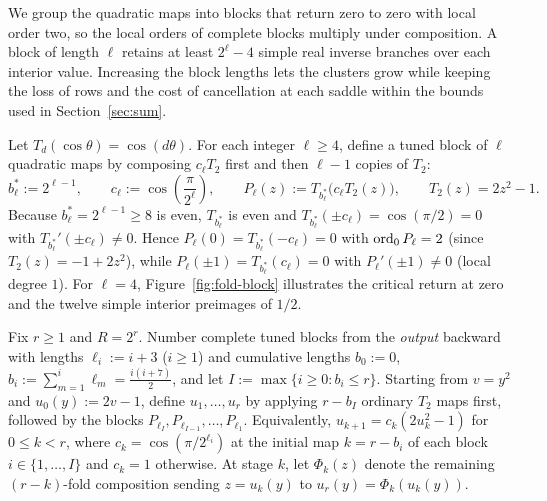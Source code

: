 We group the quadratic maps into blocks that return zero to zero with local order two, so the local orders of complete blocks multiply under composition. A block of length \(\ell\) retains at least \(2^\ell-4\) simple real inverse branches over each interior value. Increasing the block lengths lets the clusters grow while keeping the loss of rows and the cost of cancellation at each saddle within the bounds used in Section~\ref{sec:sum}.

Let $T_d(\cos\theta)=\cos(d\theta)$. For each integer $\ell\ge 4$, define a tuned block of $\ell$ quadratic maps by composing $c_\ell T_2$ first and then $\ell-1$ copies of $T_2$:
\begin{equation}\label{eq:Pl-block}
  b_\ell^* := 2^{\ell-1}, \qquad c_\ell := \cos\left(\frac{\pi}{2^{\ell}}\right), \qquad
  P_\ell(z) := T_{b_\ell^*}\bigl(c_\ell T_2(z)\bigr), \qquad T_2(z)=2z^2-1.
\end{equation}
Because $b_\ell^*=2^{\ell-1}\ge 8$ is even, $T_{b_\ell^*}$ is even and $T_{b_\ell^*}(\pm c_\ell)=\cos(\pi/2)=0$ with $T_{b_\ell^*}'(\pm c_\ell)\ne 0$. Hence $P_\ell(0)=T_{b_\ell^*}(-c_\ell)=0$ with $\operatorname{ord}_0 P_\ell=2$ (since $T_2(z)=-1+2z^2$), while $P_\ell(\pm 1)=T_{b_\ell^*}(c_\ell)=0$ with $P_\ell'(\pm 1)\ne 0$ (local degree $1$). For $\ell=4$, Figure~\ref{fig:fold-block} illustrates the critical return at zero and the twelve simple interior preimages of $1/2$.



Fix $r\ge 1$ and $R=2^r$. Number complete tuned blocks from the \emph{output} backward with lengths $\ell_i:=i+3$ ($i\ge 1$) and cumulative lengths $b_0:=0$, $b_i:=\sum_{m=1}^i \ell_m = \frac{i(i+7)}{2}$, and let $I:=\max\{i\ge 0 : b_i\le r\}$. Starting from $v=y^2$ and $u_0(y):=2v-1$, define $u_1,\dots,u_r$ by applying $r-b_I$ ordinary $T_2$ maps first, followed by the blocks $P_{\ell_I},P_{\ell_{I-1}},\dots,P_{\ell_1}$. Equivalently, $u_{k+1}=c_k(2u_k^2-1)$ for $0\le k<r$, where $c_k=\cos(\pi/2^{\ell_i})$ at the initial map $k=r-b_i$ of each block $i\in\{1,\dots,I\}$ and $c_k=1$ otherwise. At stage $k$, let $\Phi_k(z)$ denote the remaining $(r-k)$-fold composition sending $z=u_k(y)$ to $u_r(y)=\Phi_k(u_k(y))$.

